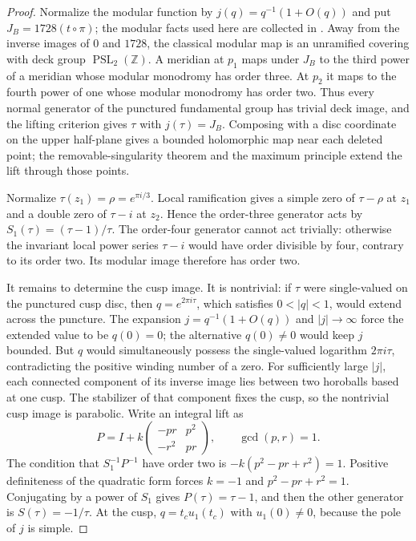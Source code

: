 \begin{proof}
Normalize the modular function by
\(j(q)=q^{-1}(1+O(q))\) and put
\(J_B=1728(t\circ\pi)\); the modular facts used here are collected in
\cite[Chapter~VII]{Serre1973}.  Away from the inverse images of \(0\) and
\(1728\), the classical modular map is an unramified covering with deck
group \(\operatorname{PSL}_2(\mathbb Z)\).  A meridian at \(p_1\) maps
under \(J_B\) to the third power of a meridian whose modular monodromy has
order three.  At \(p_2\) it maps to the fourth power of one whose modular
monodromy has order two.  Thus every normal generator of the punctured
fundamental group has trivial deck image, and the lifting criterion gives
\(\tau\) with \(j(\tau)=J_B\).  Composing with a disc coordinate on the upper
half-plane gives a bounded holomorphic map near each deleted point; the
removable-singularity theorem and the maximum principle extend the lift
through those points.

Normalize \(\tau(z_1)=\rho=e^{\pi i/3}\).  Local ramification gives a
simple zero of \(\tau-\rho\) at \(z_1\) and a double zero of \(\tau-i\)
at \(z_2\).  Hence the order-three generator acts by
\(S_1(\tau)=(\tau-1)/\tau\).  The order-four generator cannot act trivially:
otherwise the invariant local power series \(\tau-i\) would have order
divisible by four, contrary to its order two.  Its modular image therefore
has order two.

It remains to determine the cusp image.  It is nontrivial: if \(\tau\) were
single-valued on the punctured cusp disc, then
\(q=e^{2\pi i\tau}\), which satisfies \(0<|q|<1\), would extend across the
puncture.  The expansion \(j=q^{-1}(1+O(q))\) and \(|j|\to\infty\) force
the extended value to be \(q(0)=0\); the alternative \(q(0)\ne0\) would
keep \(j\) bounded.  But \(q\) would simultaneously possess the
single-valued logarithm \(2\pi i\tau\), contradicting the positive winding
number of a zero.  For sufficiently large \(|j|\), each connected component of its
inverse image lies between two horoballs based at one cusp.  The stabilizer
of that component fixes the cusp, so the nontrivial cusp image is parabolic.
Write an integral lift as
\[
 P=I+k\begin{pmatrix}-pr&p^2\\-r^2&pr\end{pmatrix},
 \qquad \gcd(p,r)=1.
\]
The condition that \(S_1^{-1}P^{-1}\) have order two is
\(-k(p^2-pr+r^2)=1\).  Positive definiteness of the quadratic form forces
\(k=-1\) and \(p^2-pr+r^2=1\).  Conjugating by a power of \(S_1\) gives
\(P(\tau)=\tau-1\), and then the other generator is
\(S(\tau)=-1/\tau\).  At the cusp,
\(q=t_cu_1(t_c)\) with \(u_1(0)\ne0\), because the pole of \(j\) is simple.


\end{proof}
